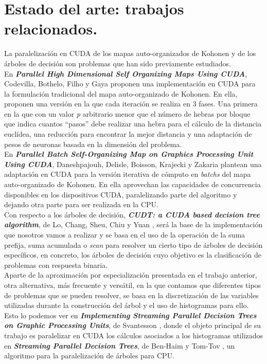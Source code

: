\documentclass[a4paper,oneside,11pt,titlepage]{book}
\begin{document}
\section{Estado del arte: trabajos relacionados.}
La paralelización en CUDA de los mapas auto-organizados de Kohonen y de los árboles de decisión son problemas que han sido previamente estudiados.\\

En \textbf{\textit{Parallel High Dimensional Self Organizing Maps Using CUDA}}, Codevilla, Bothelo, Filho y Gaya \cite{cudasomonline} proponen una implementación en CUDA para la formulación tradicional del mapa auto-organizado de Kohonen. En ella, proponen una versión en la que cada iteración se realiza en 3 fases. Una primera en la que con un valor \textit{p} arbitrario menor que el número de hebras por bloque que indica cuantos ``pasos'' debe realizar una hebra para el cálculo de la distancia euclídea, una reducción para encontrar la mejor distancia y una adaptación de pesos de neuronas basada en la dimensión del problema. \\

En \textbf{\textit{Parallel Batch Self-Organizing Map on Graphics Processing Unit Using CUDA}}, Daneshpajouh, Delisle, Boisson, Krajecki y Zakaria \cite{cudasombatch} plantean una adaptación en CUDA para la versión iterativa de cómputo en \textit{batchs} del mapa auto-organizado de Kohonen. En ella aprovechan las capacidades de concurrencia disponibles en los dispositivos CUDA, paralelizando parte del algoritmo y dejando otra parte  para ser realizada en la CPU.\\

Con respecto a los árboles de decisión, \textbf{\textit{CUDT: a CUDA based decision tree algorithm}}, de Lo, Chang, Sheu, Chiu y Yuan \cite{cudt}, será la base de la implementación que nosotros vamos a realizar y se basa en el uso de la operación de la suma prefija, suma acumulada o \textit{scan} para resolver un cierto tipo de árboles de decisión específicos, en concreto, los árboles de decisión cuyo objetivo es la clasificación de problemas con respuesta binaria.\\

Aparte de la aproximación por especialización presentada en el trabajo anterior, otra alternativa, más frecuente y versátil, en la que contamos que diferentes tipos de problemas que se pueden resolver, se basa en la discretización de las variables utilizadas durante la construcción del árbol y el uso de histogramas para ello. Esto lo podemos ver en \textbf{\textit{Implementing Streaming Parallel Decision Trees on Graphic Processing Units}}, de Svantesson \cite{svatensson}, donde el objeto principal de su trabajo es paralelizar en CUDA los cálculos asociados a los histogramas utilizados en \textbf{\textit{Streaming Parallel Decision Trees}}, de Ben-Haim y Tom-Tov \cite{spdt}, un algoritmo para la paralelización de árboles para CPU.\\
\end{document}
